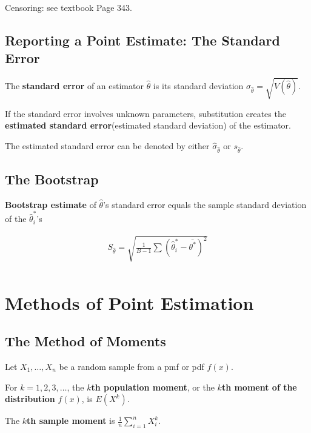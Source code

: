 \begin{proposition}
    Censoring: see textbook Page 343.
\end{proposition}

\subsection{Reporting a Point Estimate: The Standard Error}

\begin{definition}
    The \textbf{standard error} of an estimator $\hat{\theta}$ is its standard deviation $\sigma_{\hat{\theta}}=\sqrt{V(\hat{\theta})}$. 

    If the standard error involves unknown parameters, substitution creates the \textbf{estimated standard error}(estimated standard deviation) of the estimator. 

    The estimated standard error can be denoted by either $\hat{\sigma}_{\hat{\theta}}$ or $s_{\hat{\theta}}$.
\end{definition}

\subsection{The Bootstrap}

\textbf{Bootstrap estimate} of $\hat{\theta}$'s standard error equals the sample standard deviation of the $\hat{\theta}_i^*$'s 

\begin{align*}
    S_{\hat{\theta}} = \sqrt{\frac{1}{B-1}\sum\left(\hat{\theta}_i^* - \bar{\theta^*}\right)^2} \\
\end{align*}

\section{Methods of Point Estimation}

\subsection{The Method of Moments}

\begin{definition}
    Let $X_1,\dots,X_n$ be a random sample from a pmf or pdf $f(x)$. 
    
    For $k=1,2,3,\dots$, the \textbf{$k$th population moment}, or the \textbf{$k$th moment of the distribution} $f(x)$, is $E(X^k)$. 
    
    The \textbf{$k$th sample moment} is $\frac{1}{n}\sum_{i=1}^n X_i^k$.
\end{definition}


